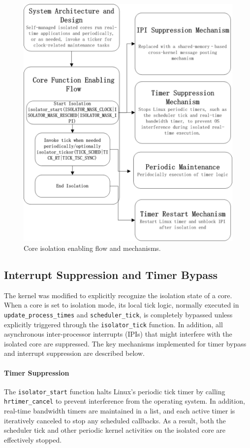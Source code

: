 \documentclass[letterpaper]{article}
\begin{document}
\begin{figure}[tb]
    \centering
    \includegraphics[width=0.9\linewidth]{Isolator.jpg}
    \caption{Core isolation enabling flow and mechanisms.}
    \label{fig:isolator_flow}
\end{figure}


\subsection{Interrupt Suppression and Timer Bypass}
\label{subsec:interrupt-timer}

The kernel was modified to explicitly recognize the isolation state of a core.
When a core is set to isolation mode, its local tick logic, normally executed in
\texttt{update\_process\_times} and \texttt{scheduler\_tick},
is completely bypassed unless explicitly triggered through the \texttt{isolator\_tick} function.
In addition, all asynchronous inter-processor interrupts (IPIs) that might interfere with the
isolated core are suppressed. The key mechanisms implemented for timer bypass and interrupt suppression are described below.

\paragraph{Timer Suppression}  
The \texttt{isolator\_start} function halts Linux’s periodic tick timer by calling \texttt{hrtimer\_cancel} to
prevent interference from the operating system. In addition, real-time bandwidth timers are maintained in a list,
and each active timer is iteratively canceled to stop any scheduled callbacks. As a result, both the scheduler tick
and other periodic kernel activities on the isolated core are effectively stopped.
\end{document}

